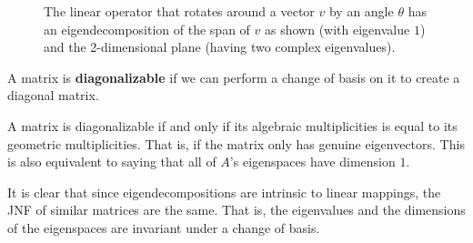   \begin{example}
    \begin{figure}[H]
      \centering 
      \caption{The linear operator that rotates around a vector $v$ by an angle $\theta$ has an eigendecomposition of the span of $v$ as shown (with eigenvalue $1$) and the 2-dimensional plane (having two complex eigenvalues). } 
      \label{fig:rotation}
    \end{figure}
  \end{example}

  \begin{definition}
    A matrix is \textbf{diagonalizable} if we can perform a change of basis on it to create a diagonal matrix. 
  \end{definition}

  \begin{theorem}
    A matrix is diagonalizable if and only if its algebraic multiplicities is equal to its geometric multiplicities. That is, if the matrix only has genuine eigenvectors. This is also equivalent to saying that all of $A$'s eigenspaces have dimension $1$. 
  \end{theorem}

  It is clear that since eigendecompositions are intrinsic to linear mappings, the JNF of similar matrices are the same. That is, the eigenvalues and the dimensions of the eigenspaces are invariant under a change of basis. 

